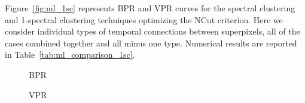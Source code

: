 Figure~\ref{fig:ml_1sc} represents BPR and VPR curves for the spectral clustering and 1-spectral clustering techniques optimizing the NCut criterion. Here we consider individual types of temporal connections between superpixels,
all of the cases combined together and all minus one type. Numerical results are reported in Table~\ref{tab:ml_comparison_1sc}.
\renewcommand*{\thesubfigure}{(\alph{subfigure})}
\begin{figure}[htbp]
\begin{minipage}[t]{1\textwidth}
\centering
\footnotesize BPR
   
\quad 
{} 
\end{minipage}
\begin{minipage}[t]{1\textwidth}
\centering
\footnotesize VPR


\end{minipage}
\end{figure}

